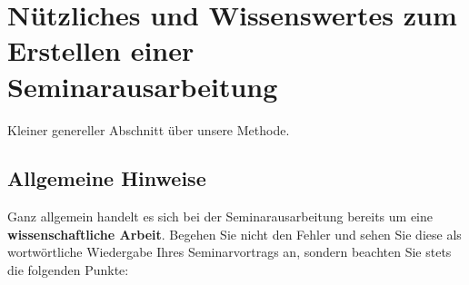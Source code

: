 %
\section{Nützliches und Wissenswertes zum Erstellen einer Seminarausarbeitung}
\label{sec_stil}

Kleiner genereller Abschnitt über unsere Methode.









\subsection{Allgemeine Hinweise}
Ganz allgemein handelt es sich bei der Seminarausarbeitung bereits um eine {\bf wissenschaftliche Arbeit}.
Begehen Sie nicht den Fehler und sehen Sie diese als wortwörtliche Wiedergabe Ihres Seminarvortrags an, sondern beachten Sie stets die folgenden Punkte:
